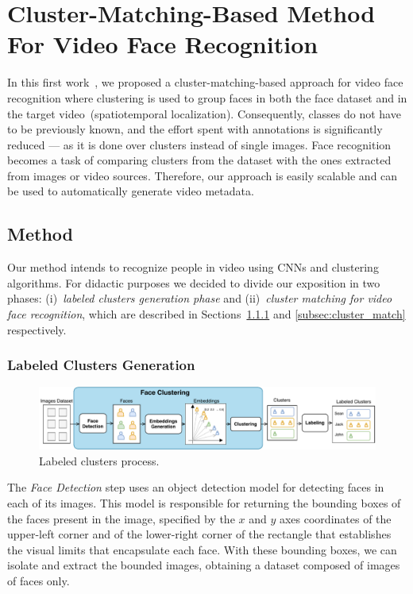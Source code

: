 \section{Cluster-Matching-Based Method For Video Face Recognition}
\label{webmedia}

In this first work~\cite{mendes2020cluster}, we proposed a cluster-matching-based approach for video face recognition where clustering is used to group faces in both the face dataset and in the target video~(spatiotemporal localization).
Consequently, classes do not have to be previously known, and the effort spent with annotations is significantly reduced --- as it is done over clusters instead of single images.
Face recognition becomes a task of comparing clusters from the dataset with the ones extracted from images or video sources.
Therefore, our approach is easily scalable and can be used to automatically generate video metadata. 

\subsection{Method}
\label{webmedia_method}

Our method intends to recognize people in video using CNNs and clustering algorithms.
For didactic purposes we decided to divide our exposition in two phases: (i)~\emph{labeled clusters generation phase} and (ii)~\emph{cluster matching for video face recognition}, which are described in Sections~\ref{subsec:labeled_clusters} and \ref{subsec:cluster_match} respectively.

\subsubsection{Labeled Clusters Generation}
\label{subsec:labeled_clusters}

\begin{figure}[!ht]
    \centering
    \includegraphics[width=\textwidth]{img/webmedia/labeled_clusters.pdf}
    \caption{Labeled clusters process.}
    \label{fig:labeled_clusters}
\end{figure}

The \textit{Face Detection} step uses an object detection model for detecting faces in each of its images.
This model is responsible for returning the bounding boxes of the faces present in the image, specified by the $x$ and $y$ axes coordinates of the upper-left corner and of the lower-right corner of the rectangle that establishes the visual limits that encapsulate each face. 
With these bounding boxes, we can isolate and extract the bounded images, obtaining a dataset composed of images of faces only.


